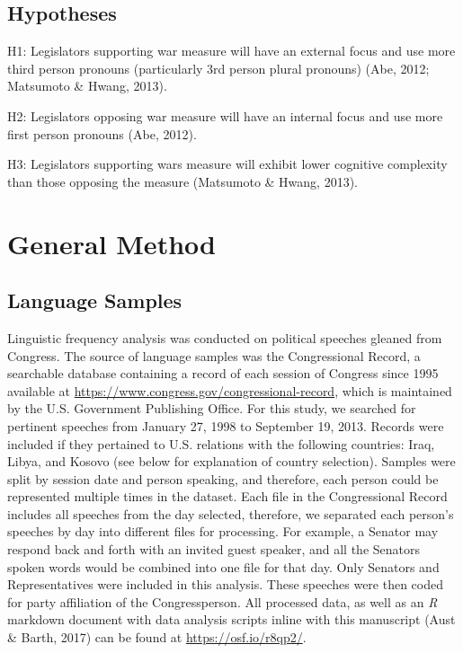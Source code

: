 \documentclass[
  english,
  ,man,floatsintext]{apa6}
\begin{document}
\hypertarget{hypotheses}{%
\subsection{Hypotheses}\label{hypotheses}}

H1: Legislators supporting war measure will have an external focus and use more third person pronouns (particularly 3rd person plural pronouns) (Abe, 2012; Matsumoto \& Hwang, 2013).

H2: Legislators opposing war measure will have an internal focus and use more first person pronouns (Abe, 2012).

H3: Legislators supporting wars measure will exhibit lower cognitive complexity than those opposing the measure (Matsumoto \& Hwang, 2013).

\hypertarget{general-method}{%
\section{General Method}\label{general-method}}

\hypertarget{language-samples}{%
\subsection{Language Samples}\label{language-samples}}

Linguistic frequency analysis was conducted on political speeches gleaned from Congress. The source of language samples was the Congressional Record, a searchable database containing a record of each session of Congress since 1995 available at \url{https://www.congress.gov/congressional-record}, which is maintained by the U.S. Government Publishing Office. For this study, we searched for pertinent speeches from January 27, 1998 to September 19, 2013. Records were included if they pertained to U.S. relations with the following countries: Iraq, Libya, and Kosovo (see below for explanation of country selection). Samples were split by session date and person speaking, and therefore, each person could be represented multiple times in the dataset. Each file in the Congressional Record includes all speeches from the day selected, therefore, we separated each person's speeches by day into different files for processing. For example, a Senator may respond back and forth with an invited guest speaker, and all the Senators spoken words would be combined into one file for that day. Only Senators and Representatives were included in this analysis. These speeches were then coded for party affiliation of the Congressperson. All processed data, as well as an \emph{R} markdown document with data analysis scripts inline with this manuscript (Aust \& Barth, 2017) can be found at \url{https://osf.io/r8qp2/}.
\end{document}
